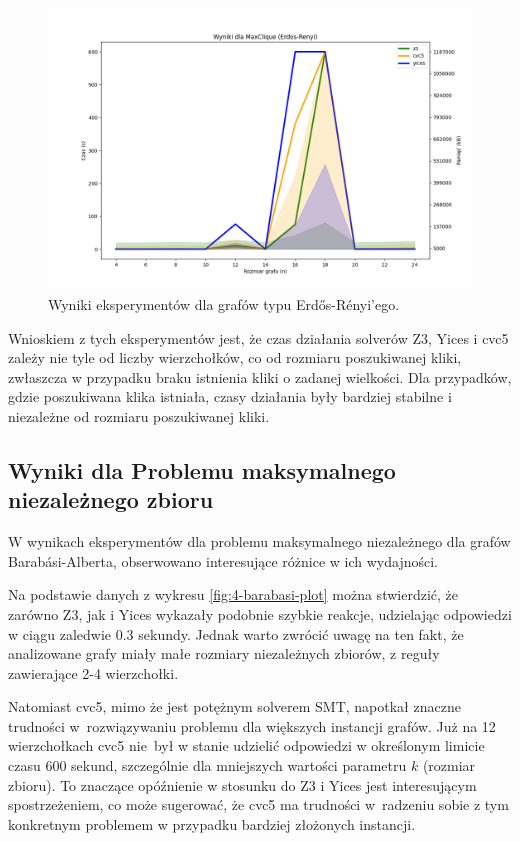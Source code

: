 \begin{figure}[htbp]
	\centering
	\begin{minipage}{\textwidth}
		\includegraphics[width=\textwidth]{./figures/3-erdos-renyi-plot.png}
		\caption{Wyniki eksperymentów dla grafów typu Erdős-Rényi'ego.}
		\label{fig:3-erdos-renyi-plot}
	\end{minipage}
\end{figure}

Wnioskiem z tych eksperymentów jest, że czas działania solverów Z3, Yices i cvc5 zależy nie tyle od liczby wierzchołków, co od rozmiaru poszukiwanej kliki, zwłaszcza w przypadku braku istnienia kliki o zadanej wielkości. Dla przypadków, gdzie poszukiwana klika istniała, czasy działania były bardziej stabilne i niezależne od rozmiaru poszukiwanej kliki.


\subsection{Wyniki dla Problemu maksymalnego niezależnego zbioru}

W wynikach eksperymentów dla problemu maksymalnego niezależnego dla grafów Barabási-Alberta, obserwowano interesujące różnice w ich wydajności.

Na podstawie danych z wykresu \ref{fig:4-barabasi-plot} można stwierdzić, że zarówno Z3, jak i Yices wykazały podobnie szybkie reakcje, udzielając odpowiedzi w ciągu zaledwie 0.3 sekundy. Jednak warto zwrócić uwagę na ten fakt, że analizowane grafy miały małe rozmiary niezależnych zbiorów, z reguły zawierające 2-4 wierzchołki.

Natomiast cvc5, mimo że jest potężnym solverem SMT, napotkał znaczne trudności w~rozwiązywaniu problemu dla większych instancji grafów. Już na 12 wierzchołkach cvc5 nie~był w stanie udzielić odpowiedzi w określonym limicie czasu 600 sekund, szczególnie dla mniejszych wartości parametru $k$ (rozmiar zbioru). To znaczące opóźnienie w stosunku do Z3 i Yices jest interesującym spostrzeżeniem, co może sugerować, że cvc5 ma trudności w~radzeniu sobie z tym konkretnym problemem w przypadku bardziej złożonych instancji.

